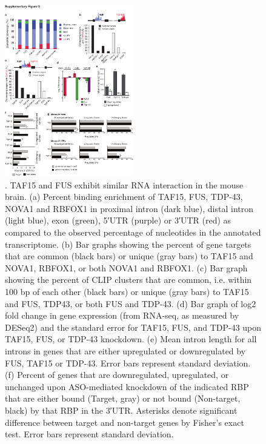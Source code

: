 \begin{figure}[ht]
  \centering
  \includegraphics[width=0.5\textwidth]{chapter_2_figures/Figure_S3}
  \caption[Supplementary Figure 3]{. TAF15 and FUS exhibit similar RNA interaction in the mouse brain. (a) Percent binding enrichment of TAF15, FUS, TDP-43, NOVA1 and RBFOX1 in proximal intron (dark blue), distal intron (light blue), exon (green), 5′UTR (purple) or 3′UTR (red) as compared to the observed percentage of nucleotides in the annotated transcriptome. (b) Bar graphs showing the percent of gene targets that are common (black bars) or unique (gray bars) to TAF15 and NOVA1, RBFOX1, or both NOVA1 and RBFOX1. (c) Bar graph showing the percent of CLIP clusters that are common, i.e. within 100 bp of each other (black bars) or unique (gray bars) to TAF15 and FUS, TDP43, or both FUS and TDP-43. (d) Bar graph of log2 fold change in gene expression (from RNA-seq, as measured by DESeq2) and the standard error for TAF15, FUS, and TDP-43 upon TAF15, FUS, or TDP-43 knockdown. (e) Mean intron length for all introns in genes that are either upregulated or downregulated by FUS, TAF15 or TDP-43. Error bars represent standard deviation. (f) Percent of genes that are downregulated, upregulated, or unchanged upon ASO-mediated knockdown of the indicated RBP that are either bound (Target, gray) or not bound (Non-target, black) by that RBP in the 3′UTR. Asterisks denote significant difference between target and non-target genes by Fisher’s exact test. Error bars represent standard deviation.}
  \label{fig:Figure_S3}
\end{figure}

